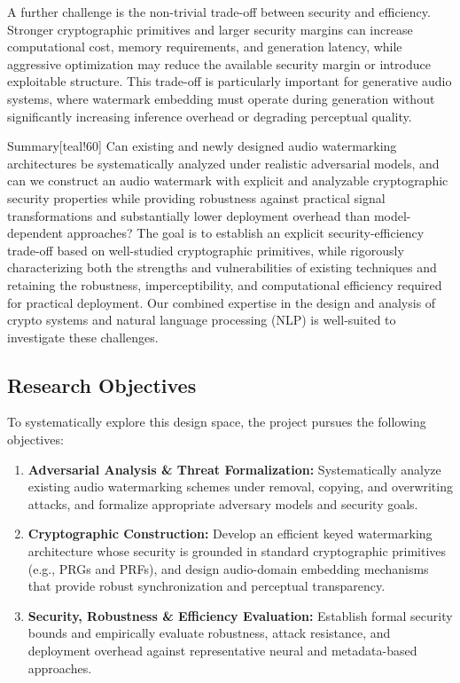 A further challenge is the non-trivial trade-off between security and efficiency.
Stronger cryptographic primitives and larger security margins can increase computational cost, memory requirements, and generation latency, while aggressive optimization may reduce the available security margin or introduce exploitable structure.
This trade-off is particularly important for generative audio systems, where watermark embedding must operate during generation without significantly increasing inference overhead or degrading perceptual quality.

\begin{genericbox}{Summary}[teal!60]
Can existing and newly designed audio watermarking architectures be systematically analyzed under realistic adversarial models, and can we construct an audio watermark with explicit and analyzable cryptographic security properties while providing robustness against practical signal transformations and substantially lower deployment overhead than model-dependent approaches?
The goal is to establish an explicit security-efficiency trade-off based on well-studied cryptographic primitives, while rigorously characterizing both the strengths and vulnerabilities of existing techniques and retaining the robustness, imperceptibility, and computational efficiency required for practical deployment.
Our combined expertise in the design and analysis of crypto systems and natural language processing (NLP) is well-suited to investigate these challenges.
\end{genericbox}

	

    \subsection{Research Objectives}
    To systematically explore this design space, the project pursues the following objectives:

\begin{enumerate}[label=\textbf{O\arabic*.}, leftmargin=*, itemsep=2pt, start=1]
\item \textbf{Adversarial Analysis \& Threat Formalization:} Systematically analyze existing audio watermarking schemes under removal, copying, and overwriting attacks, and formalize appropriate adversary models and security goals.

\item \textbf{Cryptographic Construction:} Develop an efficient keyed watermarking architecture whose security is grounded in standard cryptographic primitives (e.g., PRGs and PRFs), and design audio-domain embedding mechanisms that provide robust synchronization and perceptual transparency.

\item \textbf{Security, Robustness \& Efficiency Evaluation:} Establish formal security bounds and empirically evaluate robustness, attack resistance, and deployment overhead against representative neural and metadata-based approaches.

\end{enumerate}

